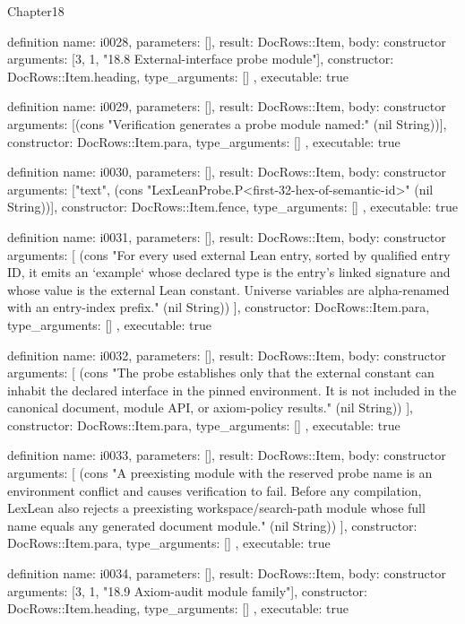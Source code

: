 \begin{lexlean}{Chapter18}
\begin{semanticmodule}
definition{
  name: i0028,
  parameters: [],
  result: DocRows::Item,
  body: constructor{
    arguments: [3, 1, "18.8 External-interface probe module"],
    constructor: DocRows::Item.heading,
    type_arguments: []
  },
  executable: true
}

definition{
  name: i0029,
  parameters: [],
  result: DocRows::Item,
  body: constructor{
    arguments: [(cons "Verification generates a probe module named:" (nil String))],
    constructor: DocRows::Item.para,
    type_arguments: []
  },
  executable: true
}

definition{
  name: i0030,
  parameters: [],
  result: DocRows::Item,
  body: constructor{
    arguments: ["text", (cons "LexLeanProbe.P<first-32-hex-of-semantic-id>" (nil String))],
    constructor: DocRows::Item.fence,
    type_arguments: []
  },
  executable: true
}

definition{
  name: i0031,
  parameters: [],
  result: DocRows::Item,
  body: constructor{
    arguments: [
      (cons "For every used external Lean entry, sorted by qualified entry ID, it emits an `example` whose declared type is the entry's linked signature and whose value is the external Lean constant. Universe variables are alpha-renamed with an entry-index prefix." (nil String))
    ],
    constructor: DocRows::Item.para,
    type_arguments: []
  },
  executable: true
}

definition{
  name: i0032,
  parameters: [],
  result: DocRows::Item,
  body: constructor{
    arguments: [
      (cons "The probe establishes only that the external constant can inhabit the declared interface in the pinned environment. It is not included in the canonical document, module API, or axiom-policy results." (nil String))
    ],
    constructor: DocRows::Item.para,
    type_arguments: []
  },
  executable: true
}

definition{
  name: i0033,
  parameters: [],
  result: DocRows::Item,
  body: constructor{
    arguments: [
      (cons "A preexisting module with the reserved probe name is an environment conflict and causes verification to fail. Before any compilation, LexLean also rejects a preexisting workspace/search-path module whose full name equals any generated document module." (nil String))
    ],
    constructor: DocRows::Item.para,
    type_arguments: []
  },
  executable: true
}

definition{
  name: i0034,
  parameters: [],
  result: DocRows::Item,
  body: constructor{
    arguments: [3, 1, "18.9 Axiom-audit module family"],
    constructor: DocRows::Item.heading,
    type_arguments: []
  },
  executable: true
}


\end{semanticmodule}
\end{lexlean}
